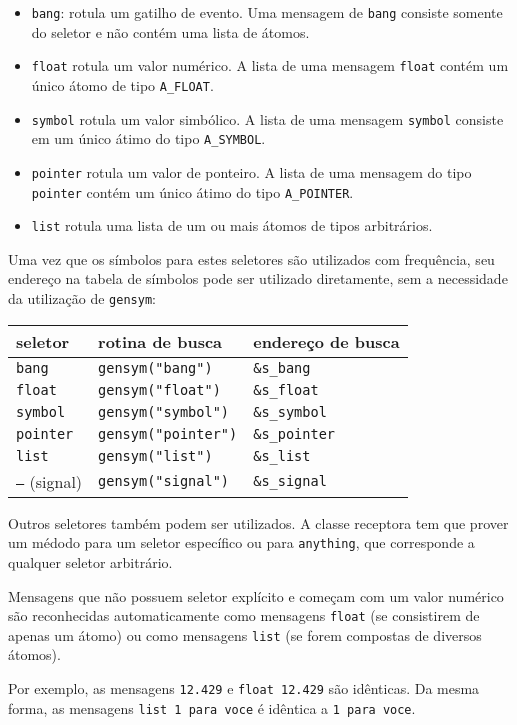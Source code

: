 \begin{itemize}
  \item \texttt{bang}: rotula um gatilho de evento. Uma mensagem de
    \texttt{bang} consiste somente do seletor e não contém uma lista de átomos.
  \item \texttt{float} rotula um valor numérico. A lista de uma mensagem
    \texttt{float} contém um único átomo de tipo \texttt{A\_FLOAT}.
  \item \texttt{symbol} rotula um valor simbólico. A lista de uma mensagem
    \texttt{symbol} consiste em um único átimo do tipo \texttt{A\_SYMBOL}.
  \item \texttt{pointer} rotula um valor de ponteiro. A lista de uma mensagem do
    tipo \texttt{pointer} contém um único átimo do tipo \texttt{A\_POINTER}.
  \item \texttt{list} rotula uma lista de um ou mais átomos de tipos arbitrários.
\end{itemize}

Uma vez que os símbolos para estes seletores são utilizados com frequência,
seu endereço na tabela de símbolos pode ser utilizado diretamente, sem a
necessidade da utilização de \texttt{gensym}:

\begin{center}
\begin{tabular}{|l|l|l|}
\hline
  seletor & rotina de busca & endereço de busca \\
\hline
  \texttt{bang} & \texttt{gensym("bang")} & \texttt{\&s\_bang} \\
  \texttt{float} & \texttt{gensym("float")} & \texttt{\&s\_float} \\
  \texttt{symbol} & \texttt{gensym("symbol")} & \texttt{\&s\_symbol} \\
  \texttt{pointer} & \texttt{gensym("pointer")} & \texttt{\&s\_pointer} \\
  \texttt{list} & \texttt{gensym("list")} & \texttt{\&s\_list} \\
  \texttt{--}  (signal) & \texttt{gensym("signal")} & \texttt{\&s\_signal} \\
\hline
\end{tabular}
\end{center}

Outros seletores também podem ser utilizados. A classe receptora tem que
prover um médodo para um seletor específico ou para \texttt{anything}, que
corresponde a qualquer seletor arbitrário.

Mensagens que não possuem seletor explícito e começam com um valor numérico
são reconhecidas automaticamente como mensagens \texttt{float} (se consistirem
de apenas um átomo) ou como mensagens \texttt{list} (se forem compostas de
diversos átomos).

Por exemplo, as mensagens \texttt{12.429} e \texttt{float 12.429} são
idênticas. Da mesma forma, as mensagens \texttt{list 1 para voce} é idêntica a
\texttt{1 para voce}.


